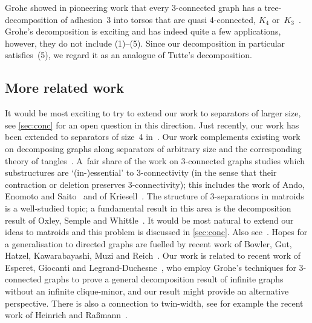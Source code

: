\documentclass{aic}
\theoremstyle{plain}
\theoremstyle{definition}
\theoremstyle{plain}
\theoremstyle{plain}
\begin{document}
Grohe showed in pioneering work that every 3-connected graph has a tree-decomposition of adhesion~3 into torsos that are quasi 4-connected, $K_4$ or~$K_3$~\cite{grohe2016quasi}.
Grohe's decomposition is exciting and has indeed quite a few applications, however, they do not include (1)--(5).
Since our decomposition in particular satisfies~(5), we regard it as an analogue of Tutte's decomposition.


\subsection*{More related work}

It would be most exciting to try to extend our work to separators of larger size, see  \autoref{sec:conc} for an open question in this direction.
Just recently, our work has been extended to separators of size~4 in~\cite{Tutte4con}.
Our work complements existing work on decomposing graphs along separators of arbitrary size and the corresponding theory of tangles~\cite{albrechtsen2023refining,CarmesinToTshort,CDHH13CanonicalAlg,CDHH13CanonicalParts,confing,CG14:isolatingblocks,Entanglements,ASS,TreeSets,StructuralASS,ProfilesNew,FiniteSplinters,InfiniteSplinters,RefiningToT,GroheTangles3,ComputingTangles,jacobs2023efficiently,GMX}.
A~fair share of the work on 3-connected graphs studies which substructures are `\mbox{(in-)}essential' to 3-connectivity (in the sense that their contraction or deletion preserves 3-connectivity); this includes the work of Ando, Enomoto and Saito~\cite{ando1987contractible} and of Kriesell~\cite{KriesellNonEdges,KriesellContractibleSubgraph,KriesellAlmostAll,KriesellTriangleFree,kriesell2008number,KriesellVertexSuppression}.
The structure of 3-separations in matroids is a well-studied topic; a fundamental result in this area is the decomposition result of Oxley, Semple and Whittle~\cite{Structure3sepsMatroids}. It would be most natural to extend our ideas to matroids and this problem is discussed in \autoref{sec:conc}.
Also see~\cite{4connectedMatroids}.
Hopes for a generalisation to directed graphs are fuelled by recent work of Bowler, Gut, Hatzel, Kawarabayashi, Muzi and Reich~\cite{Flo}.
Our work is related to recent work of Esperet, Giocanti and Legrand-Duchesne~\cite{Ugo}, who employ Grohe's techniques for 3-connected graphs to prove a general decomposition result of infinite graphs without an infinite clique-minor, and our result might provide an alternative perspective. 
There is also a connection to twin-width, see for example the recent work of Heinrich and Raßmann~\cite{TwinWidth}.
\end{document}
